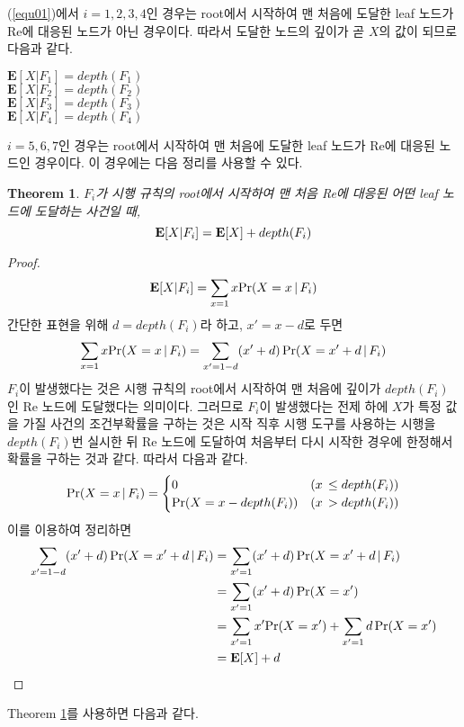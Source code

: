 \documentclass[11pt]{article}
\newtheorem{theorem}{Theorem}
\begin{document}
(\ref{equ01})에서 $i = 1,2,3,4$인 경우는 root에서 시작하여 맨 처음에 도달한 leaf 노드가 Re에 대응된 노드가 아닌 경우이다. 따라서 도달한 노드의 깊이가 곧 $X$의 값이 되므로 다음과 같다.

\singlespacing
\begin{center}
$\textbf{E}[X|F_{1}]=depth(F_{1})$\\
$\textbf{E}[X|F_{2}]=depth(F_{2})$\\
$\textbf{E}[X|F_{3}]=depth(F_{3})$\\
$\textbf{E}[X|F_{4}]=depth(F_{4})$\\
\end{center}
\doublespacing

$i = 5,6,7$인 경우는 root에서 시작하여 맨 처음에 도달한 leaf 노드가 Re에 대응된 노드인 경우이다. 이 경우에는 다음 정리를 사용할 수 있다.

\singlespacing
\begin{theorem}
$F_{i}$가 시행 규칙의 root에서 시작하여 맨 처음 Re에 대응된 어떤 leaf 노드에 도달하는 사건일 때,\\
\[\textnormal{\textbf{E}}[X|F_{i}]=\textnormal{\textbf{E}}[X]+depth(F_{i})\]
\label{thm02}
\end{theorem}
\doublespacing

\begin{proof}
\[\textnormal{\textbf{E}}[X|F_{i}] = \sum_{x=1} x \textnormal{Pr}(X = x\,|\,F_{i})\]
간단한 표현을 위해 $d = depth(F_{i})$라 하고, $x'=x-d$로 두면
\[\sum_{x=1} x \textnormal{Pr}(X = x\,|\,F_{i}) = \sum_{x'=1-d} (x'+d)\,\textnormal{Pr}(X = x'+d\,|\,F_{i})\]
$F_{i}$이 발생했다는 것은 시행 규칙의 root에서 시작하여 맨 처음에 깊이가 $depth(F_{i})$인 Re 노드에 도달했다는 의미이다. 그러므로 $F_{i}$이 발생했다는 전제 하에 $X$가 특정 값을 가질 사건의 조건부확률을 구하는 것은 시작 직후 시행 도구를 사용하는 시행을 $depth(F_{i})$번 실시한 뒤 Re 노드에 도달하여 처음부터 다시 시작한 경우에 한정해서 확률을 구하는 것과 같다. 따라서 다음과 같다.
\[
\textnormal{Pr}(X = x\,|\,F_{i}) =
\begin{cases}
0 & (x\,\le depth(F_{i}))\\
\textnormal{Pr}(X = x-depth(F_{i})) & (x\,> depth(F_{i}))
\end{cases}
\]
이를 이용하여 정리하면
\[
\begin{split}
\sum_{x'=1-d} (x'+d)\,\textnormal{Pr}(X = x'+d\,|\,F_{i}) & = \sum_{x'=1} (x'+d)\,\textnormal{Pr}(X = x'+d\,|\,F_{i})\\
& = \sum_{x'=1} (x'+d)\,\textnormal{Pr}(X = x')\\
& = \sum_{x'=1} x'\textnormal{Pr}(X = x') + \sum_{x'=1} d\,\textnormal{Pr}(X = x')\\
& = \textnormal{\textbf{E}}[X]+d
\end{split}
\]
\end{proof}
\noindent Theorem \ref{thm02}를 사용하면 다음과 같다.
\end{document}
